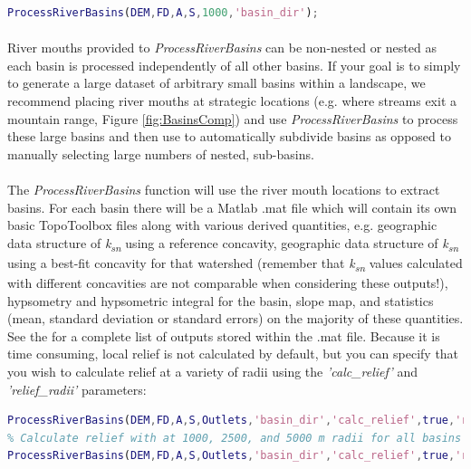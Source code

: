 \begin{lstlisting}[language=Matlab]
% To create basins with outlets above 1000 meters elevation
ProcessRiverBasins(DEM,FD,A,S,1000,'basin_dir');
\end{lstlisting}

\paragraph{}River mouths provided to \textit{ProcessRiverBasins} can be non-nested or nested as each basin is processed independently of all other basins. If your goal is to simply to generate a large dataset of arbitrary small basins within a landscape, we recommend placing river mouths at strategic locations (e.g. where streams exit a mountain range, Figure \ref{fig:BasinsComp}) and use \textit{ProcessRiverBasins} to process these large basins and then use  to automatically subdivide basins as opposed to manually selecting large numbers of nested, sub-basins.

\paragraph{}The \textit{ProcessRiverBasins} function will use the river mouth locations to extract basins. For each basin there will be a Matlab .mat file which will contain its own basic TopoToolbox files along with various derived quantities, e.g. geographic data structure of \textit{k\textsubscript{sn}} using a reference concavity, geographic data structure of \textit{k\textsubscript{sn}} using a best-fit concavity for that watershed (remember that \textit{k\textsubscript{sn}} values calculated with different concavities are not comparable when considering these outputs!), hypsometry and hypsometric integral for the basin, slope map, and statistics (mean, standard deviation or standard errors) on the majority of these quantities. See the  for a complete list of outputs stored within the .mat file. Because it is time consuming, local relief is not calculated by default, but you can specify that you wish to calculate relief at a variety of radii using the \textit{'calc\_relief'} and \textit{'relief\_radii'} parameters:

\begin{lstlisting}[language=Matlab]
% Calculate relief with a radius of 2500 m for all basins
ProcessRiverBasins(DEM,FD,A,S,Outlets,'basin_dir','calc_relief',true,'relief_radii',2500);
% Calculate relief with at 1000, 2500, and 5000 m radii for all basins
ProcessRiverBasins(DEM,FD,A,S,Outlets,'basin_dir','calc_relief',true,'relief_radii',[1000 2500 5000]);
\end{lstlisting}

